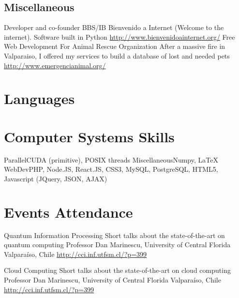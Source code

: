 \documentclass[11pt,a4paper,sans]{moderncv}
\begin{document}
\subsection{Miscellaneous}


        {Developer and co-founder}
        {BBS/IB Bienvenido a Internet (Welcome to the internet). Software built in Python}
        {}
        {}
        {\url{http://www.bienvenidoainternet.org/}}
        {Free Web Development For Animal Rescue Organization}
        {After a massive fire in Valparaiso, I offered my services to build a database of lost and needed pets}
        {}
        {}
        {\url{http://www.emergencianimal.org/}}

\section{Languages}

\section{Computer Systems Skills}
           {Parallel}{CUDA (primitive), POSIX threads}
           {Miscellaneous}{Numpy, \LaTeX}
           {WebDev}{PHP, Node.JS, React.JS, CSS3, MySQL, PostgreSQL, HTML5, Javascript (JQuery, JSON, AJAX)}

\section{Events Attendance}

        {Quantum Information Processing}
        {Short talks about the state-of-the-art on quantum computing}
        {Professor Dan Marinescu, University of Central Florida}
        {Valparaíso, Chile}
        {\url{http://cci.inf.utfsm.cl/?p=399}}

        {Cloud Computing}
        {Short talks about the state-of-the-art on cloud computing}
        {Professor Dan Marinescu, University of Central Florida}
        {Valparaíso, Chile}
        {\url{http://cci.inf.utfsm.cl/?p=399}}
\end{document}
